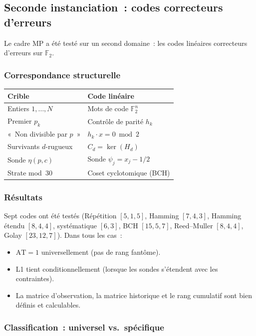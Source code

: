 \documentclass[12pt,a4paper]{article}
\begin{document}
\subsection{Seconde instanciation~: codes correcteurs d'erreurs}
\label{sec:PM_codes}

Le cadre MP a été testé sur un second domaine~: les codes linéaires
correcteurs d'erreurs sur $\mathbb{F}_2$.

\subsubsection{Correspondance structurelle}

\begin{center}
\begin{tabular}{ll}
\toprule
\textbf{Crible} & \textbf{Code linéaire} \\
\midrule
Entiers $1, \ldots, N$ & Mots de code $\mathbb{F}_2^n$ \\
Premier $p_k$ & Contrôle de parité $h_k$ \\
«~Non divisible par $p$~» & $h_k \cdot x = 0 \bmod 2$ \\
Survivants $d$-rugueux & $C_d = \ker(H_d)$ \\
Sonde $\eta(p, c)$ & Sonde $\psi_j = x_j - 1/2$ \\
Strate mod~30 & Coset cyclotomique (BCH) \\
\bottomrule
\end{tabular}
\end{center}

\subsubsection{Résultats}

Sept codes ont été testés (Répétition $[5,1,5]$, Hamming $[7,4,3]$,
Hamming étendu $[8,4,4]$, systématique $[6,3]$, BCH $[15,5,7]$,
Reed--Muller $[8,4,4]$, Golay $[23,12,7]$). Dans tous les cas~:
\begin{itemize}[nosep]
  \item $\mathrm{AT} = 1$ universellement (pas de rang fantôme).
  \item L1 tient conditionnellement (lorsque les sondes s'étendent
    avec les contraintes).
  \item La matrice d'observation, la matrice historique et le rang
    cumulatif sont bien définis et calculables.
\end{itemize}

\subsubsection{Classification~: universel vs.\ spécifique}
\end{document}
